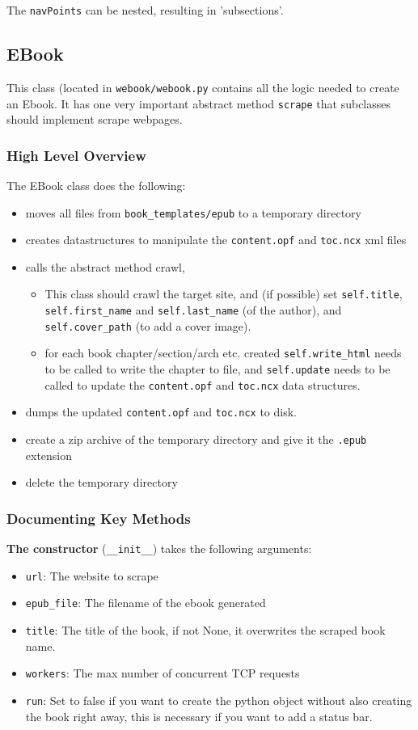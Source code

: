 \documentclass[]{report}   %
\begin{document}
The \texttt{navPoints} can be nested, resulting in 'subsections'.

\subsection{EBook}
This class (located in \texttt{webook/webook.py} contains all the logic needed
to create an Ebook. It has one very important abstract method \texttt{scrape}
that subclasses should implement scrape webpages.

\subsubsection{High Level Overview}
The EBook class does the following:

\begin{itemize}
	\item moves all files from \texttt{book\_templates/epub} to a temporary directory
	\item creates datastructures to manipulate the \texttt{content.opf} and \texttt{toc.ncx} xml files
	\item calls the abstract method crawl, 
	\begin{itemize}
		\item  This class should crawl the target site, and (if possible) set
			\texttt{self.title}, \texttt{self.first\_name} and \texttt{self.last\_name} (of the author), and
			\texttt{self.cover\_path} (to add a cover image).
		\item for each book chapter/section/arch etc. created
			\texttt{self.write\_html} needs to be called to write the chapter
			to file, and \texttt{self.update} needs to be called to update the
			\texttt{content.opf} and \texttt{toc.ncx} data structures.
	\end{itemize}
		\item dumps the updated \texttt{content.opf} and \texttt{toc.ncx} to disk. 
		\item create a zip archive of the temporary directory and give it the \texttt{.epub} extension
		\item delete the temporary directory
\end{itemize}

\subsubsection{Documenting Key Methods}
\textbf{The constructor} (\texttt{\_\_init\_\_}) takes the following arguments:
\begin{itemize}
	\item \texttt{url}: The website to scrape
	\item \texttt{epub\_file}: The filename of the ebook generated
	\item \texttt{title}: The title of the book, if not None, it overwrites the scraped book name.
	\item \texttt{workers}: The max number of concurrent TCP requests
	\item \texttt{run}: Set to false if you want to create the python object without also creating the book right away, this is necessary if you want to add a status bar. 
\end{itemize}
\end{document}
